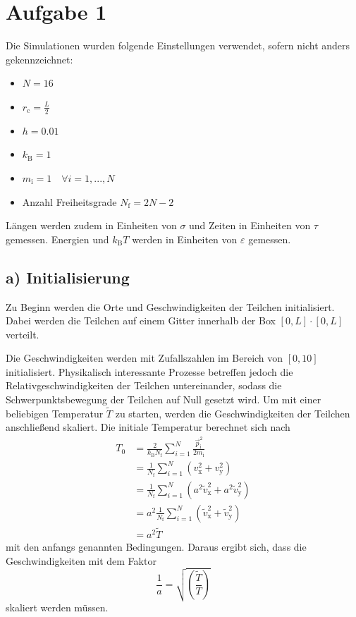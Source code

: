 \section*{Aufgabe 1}

Die Simulationen wurden folgende Einstellungen verwendet, sofern nicht anders
gekennzeichnet:
\begin{itemize}
    \item $N = 16$
    \item $r_\text{c} = \frac{L}{2}$
    \item $h = \num{0,01}$
    \item $k_\text{B} = 1$
    \item $m_\text{i} = 1 \quad \forall i = 1, ..., N$
    \item Anzahl Freiheitsgrade $N_\text{f} = 2 N - 2$
\end{itemize}
Längen werden zudem in Einheiten von $\sigma$ und Zeiten in Einheiten von $\tau$ gemessen.
Energien und $k_\text{B} T$ werden in Einheiten von $\varepsilon$ gemessen.

\subsection*{a) Initialisierung}

Zu Beginn werden die Orte und Geschwindigkeiten der Teilchen initialisiert.
Dabei werden die Teilchen auf einem Gitter innerhalb der Box $[0,L] \cdot [0,L]$ verteilt.

Die Geschwindigkeiten werden mit Zufallszahlen im Bereich von \([0, 10]\) initialisiert. Physikalisch interessante Prozesse betreffen jedoch die Relativgeschwindigkeiten
der Teilchen untereinander, sodass die Schwerpunktsbewegung der Teilchen auf
Null gesetzt wird.
Um mit einer beliebigen Temperatur $\tilde{T}$ zu starten, werden die Geschwindigkeiten der
Teilchen anschließend skaliert. Die initiale Temperatur berechnet sich nach
\begin{align*}
    T_0 &=
    \frac{2}{k_\text{B} N_\text{f}} \sum_{i=1}^N \frac{\vec{p}_\text{i}^2}{2 m_\text{i}} \\
    &= \frac{1}{N_\text{f}} \sum_{i=1}^N \left(v_\text{x}^2 + v_\text{y}^2\right) \\
    &= \frac{1}{N_\text{f}} \sum_{i=1}^N
        \left(a^2 \tilde{v}_\text{x}^2 + a^2 \tilde{v}_\text{y}^2\right) \\
    &= a^2 \frac{1}{N_\text{f}} \sum_{i=1}^N
        \left(\tilde{v}_\text{x}^2 + \tilde{v}_\text{y}^2\right) \\
    &= a^2 \tilde{T}
\end{align*}
mit den anfangs genannten Bedingungen.
Daraus ergibt sich, dass die Geschwindigkeiten mit dem Faktor
\begin{equation*}
    \frac{1}{a} = \sqrt{\!\left(\frac{\tilde{T}}{T}\right)}
\end{equation*}
skaliert werden müssen.

